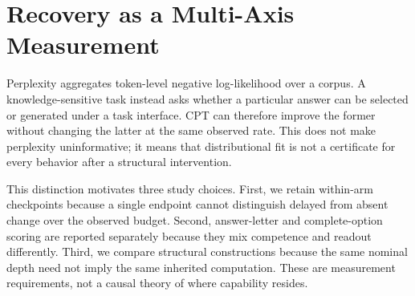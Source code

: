 \section{Recovery as a Multi-Axis Measurement}
\label{sec:observation}

Perplexity aggregates token-level negative log-likelihood over a corpus. A
knowledge-sensitive task instead asks whether a particular answer can be
selected or generated under a task interface. CPT can therefore improve the
former without changing the latter at the same observed rate. This does not make
perplexity uninformative; it means that distributional fit is not a certificate
for every behavior after a structural intervention.

This distinction motivates three study choices. First, we retain within-arm
checkpoints because a single endpoint cannot distinguish delayed from absent
change over the observed budget. Second, answer-letter and complete-option
scoring are reported separately because they mix competence and readout
differently. Third, we compare structural constructions because the same nominal
depth need not imply the same inherited computation. These are measurement
requirements, not a causal theory of where capability resides.
